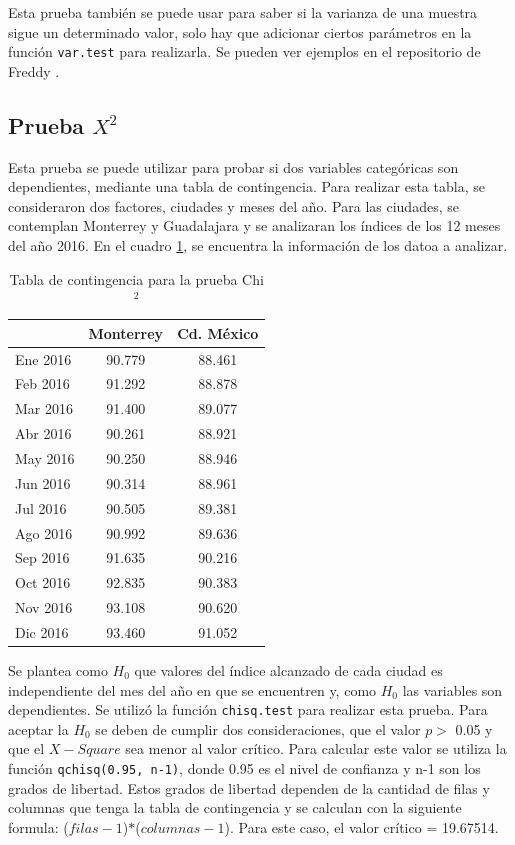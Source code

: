 \documentclass{article}
\begin{document}
    
Esta prueba también se puede usar para saber si la varianza de una muestra sigue un determinado valor, solo hay que adicionar ciertos parámetros en la función \texttt{var.test} para realizarla. Se pueden ver ejemplos en el repositorio de Freddy \cite{freddy}.
    
\subsection{Prueba $X^2$}
Esta prueba se puede utilizar para probar si dos variables categóricas son dependientes, mediante una tabla de contingencia. Para realizar esta tabla, se consideraron dos factores, ciudades y meses del año. Para las ciudades, se contemplan Monterrey y Guadalajara y se analizaran los índices de los 12 meses del año 2016. En el cuadro \ref{tablacontingencia}, se encuentra la información de los datoa a analizar.
    
\begin{table}
\centering
\caption{Tabla de contingencia para la prueba Chi$^2$}
\begin{tabular}{|l|c|c|}
\hline
         & Monterrey & Cd. México \\ \hline
 Ene 2016 & 90.779    & 88.461     \\ \hline
 Feb 2016 & 91.292    & 88.878     \\ \hline
 Mar 2016 & 91.400    & 89.077     \\ \hline
 Abr 2016 & 90.261    & 88.921     \\ \hline
 May 2016 & 90.250    & 88.946     \\ \hline
 Jun 2016 & 90.314    & 88.961     \\ \hline
 Jul 2016 & 90.505    & 89.381     \\ \hline
 Ago 2016 & 90.992    & 89.636     \\ \hline
 Sep 2016 & 91.635    & 90.216     \\ \hline
 Oct 2016 & 92.835    & 90.383     \\ \hline
 Nov 2016 & 93.108    & 90.620     \\ \hline
 Dic 2016 & 93.460    & 91.052     \\ \hline
\end{tabular}
\label{tablacontingencia}
\end{table}

Se plantea como $H_{0}$ que valores del índice alcanzado de cada ciudad es independiente del mes del año en que se encuentren y, como $H_{0}$ las variables son dependientes. Se utilizó la función \texttt{chisq.test} para realizar esta prueba. Para aceptar la $H_{0}$ se deben de cumplir dos consideraciones, que el valor $p >$ 0.05 y que el $X-Square$ sea menor al valor crítico. Para calcular este valor se utiliza la función \texttt{qchisq(0.95, n-1)}, donde 0.95 es el nivel de confianza y n-1 son los grados de libertad. Estos grados de libertad dependen de la cantidad de filas y columnas que tenga la tabla de contingencia y se calculan con la siguiente formula: ($filas-1$)$*$($columnas-1$). Para este caso, el valor crítico = 19.67514.
\end{document}
